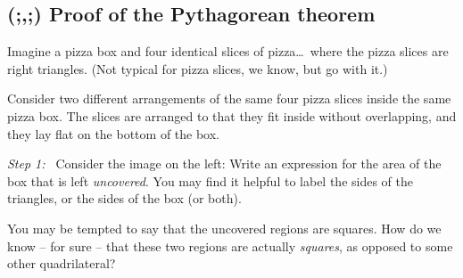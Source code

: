\subsection{(;,;) Proof of the {P}ythagorean theorem}
\label{sec:pythagproof}

Imagine a pizza box and four identical slices of pizza\ldots\ where the pizza slices are right triangles. (Not typical for pizza slices, we know, but go with it.)

\begin{center}
\end{center}

Consider two different arrangements of the same four pizza slices inside the same pizza box. The slices are arranged to that they fit inside without overlapping, and they lay flat on the bottom of the box.

\begin{center}
\end{center}

\textit{Step 1:~} Consider the image on the left: Write an expression for the area of the box that is left \textit{uncovered}. You may find it helpful to label the sides of the triangles, or the sides of the box (or both).

You may be tempted to say that the uncovered regions are squares. How do we know -- for sure -- that these two regions are actually \textit{squares}, as opposed to some other quadrilateral?


